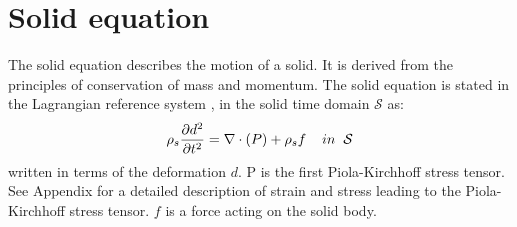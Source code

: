 \section{Solid equation}
The solid equation describes the motion of a solid. It is derived from the principles of conservation of mass and momentum. The solid equation is stated in the Lagrangian reference system \cite{Richter2016}, in the solid time domain $\mathcal{S}$ as:
\begin{equation}\label{eq:Solid}
\rho_s \frac{\partial d^2}{\partial t^2} = \nabla \cdot ( P ) + \rho_s f  \hspace{4mm} in \hspace{2mm} \mathcal{S}
\end{equation}
written in terms of the deformation $d$. 
P is the first Piola-Kirchhoff stress tensor. See Appendix for a detailed description of strain and stress leading to the Piola-Kirchhoff stress tensor. 
$f$ is a force acting on the solid body.


\begin{comment}
\subsection*{Locking}
The problem og shear locking can happen FEM computations with certain elements. 
[mek4250 Kent] - Locking occurs if  $ \lambda >> \nu $ that is, the material is nearly incompressible. The reason is that all the elements discussed in this course are poor at approximating the divergence. Locking refers to the case where the displacement is to small because the divergence term essentially lock the displacement. It is a numerical artifact not a physical feature. [Verbatum]
\end{comment}
